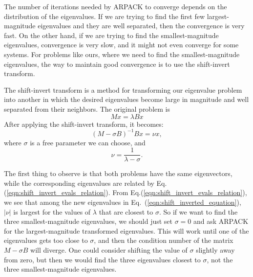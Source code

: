 \documentclass{iopjournal}
\begin{document}
The number of iterations needed by ARPACK to converge depends on the distribution of the eigenvalues. If we are trying to find the first few largest-magnitude eigenvalues and they are well separated, then the convergence is very fast. On the other hand, if we are trying to find the smallest-magnitude eigenvalues, convergence is very slow, and it might not even converge for some systems. For problems like ours, where we need to find the smallest-magnitude eigenvalues, the way to maintain good convergence is to use the shift-invert transform.

The shift-invert transform is a method for transforming our eigenvalue problem into another in which the desired eigenvalues become large in magnitude and well separated from their neighbors. The original problem is
\begin{equation}
    M x = \lambda B x
\end{equation}
After applying the shift-invert transform, it becomes:
\begin{equation}
    (M - \sigma B)^{-1} B x = \nu x , 
    \label{eqn:shift_inverted_equation}
\end{equation}  
where $\sigma$ is a free parameter we can choose, and
\begin{equation}
    \nu = \frac{1}{\lambda - \sigma}.
    \label{eqn:shift_invert_evals_relation}
\end{equation}

The first thing to observe is that both problems have the same eigenvectors, while the corresponding eigenvalues are related by Eq.(\ref{eqn:shift_invert_evals_relation}). From Eq.(\ref{eqn:shift_invert_evals_relation}), we see that among the new eigenvalues in Eq.~(\ref{eqn:shift_inverted_equation}), $|\nu|$ is largest for the values of $\lambda$ that are closest to $\sigma$. So if we want to find the three smallest-magnitude eigenvalues, we should just set $\sigma = 0$ and ask ARPACK for the largest-magnitude transformed eigenvalues. This will work until one of the eigenvalues gets too close to $\sigma$, and then the condition number of the matrix $M-\sigma B$ will diverge. One could consider shifting the value of $\sigma$ slightly away from zero, but then we would find the three eigenvalues closest to $\sigma$, not the three smallest-magnitude eigenvalues.
\end{document}
